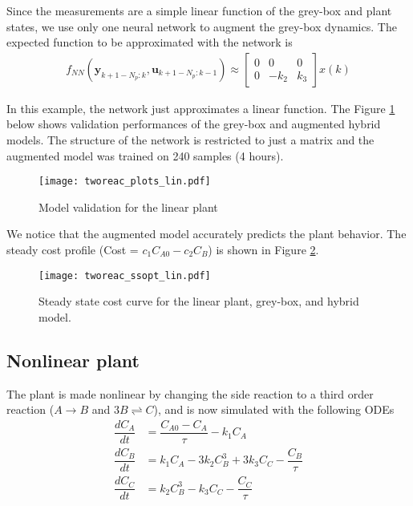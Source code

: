 \documentclass{article}
\begin{document}
Since the measurements are a simple linear function 
of the grey-box and plant states, we use only one 
neural network to 
augment the grey-box dynamics. 
The expected function 
to be approximated with the network is
\begin{align*}
  f_{NN}(\mathbf{y}_{k+1-N_p:k}, \mathbf{u}_{k+1-N_p:k-1}) \approx 
  \begin{bmatrix}
  0 & 0 & 0 \\  
  0 & -k_2 & k_3 
  \end{bmatrix}x(k)
\end{align*}

In this example, the network just approximates a linear function.
The Figure \ref{fig:validation_linear} 
below shows validation performances of the grey-box 
and augmented hybrid models. The structure 
of the network is restricted to just a matrix and
the augmented model was trained on 240 samples (4 hours).

\begin{figure}[!h]
  \centering
  \texttt{[image: tworeac\_plots\_lin.pdf]}
  \caption{Model validation for the linear plant}
  \label{fig:validation_linear}
\end{figure}

We notice that the augmented model accurately predicts the plant 
behavior. The steady cost profile (Cost = $c_1C_{A0} - c_2C_B$)
is shown in Figure \ref{fig:cost_linear}. 

\begin{figure}[!h]
  \centering
  \texttt{[image: tworeac\_ssopt\_lin.pdf]}
  \caption{Steady state cost curve for 
           the linear plant, grey-box, and hybrid model.}
  \label{fig:cost_linear}
\end{figure}


\subsection{Nonlinear plant}
The plant is made nonlinear by changing the side reaction 
to a third order reaction ($A \rightarrow B $ and  $3B \rightleftharpoons C$),
and is now simulated with the following ODEs
\begin{align*}
  \dfrac{dC_A}{dt} &= \dfrac{C_{A0} - C_A}{\tau} - k_1C_A\\
  \dfrac{dC_B}{dt} &= k_1C_A - 3k_2C^3_B + 3k_3C_C- \dfrac{C_B}{\tau}\\
  \dfrac{dC_C}{dt} &= k_2C^3_B - k_3C_C - \dfrac{C_C}{\tau}
\end{align*}
\end{document}

